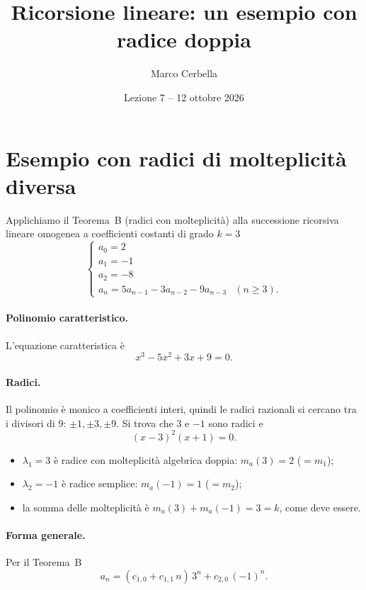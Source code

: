 \documentclass[11pt,a4paper]{article}
\title{Ricorsione lineare: un esempio con radice doppia}
\author{Marco Cerbella}
\date{Lezione 7 -- 12 ottobre 2026}
\begin{document}
\maketitle

\section{Esempio con radici di molteplicità diversa}

Applichiamo il Teorema~B (radici con molteplicità) alla successione ricorsiva lineare omogenea a coefficienti costanti di grado $k = 3$
\[
\begin{cases}
a_0 = 2 \\
a_1 = -1 \\
a_2 = -8 \\
a_n = 5a_{n-1} - 3a_{n-2} - 9a_{n-3} & (n \geq 3).
\end{cases}
\]

\paragraph{Polinomio caratteristico.} L'equazione caratteristica è
\[
x^3 - 5x^2 + 3x + 9 = 0 .
\]

\paragraph{Radici.} Il polinomio è monico a coefficienti interi, quindi le radici razionali si cercano tra i divisori di $9$: $\pm 1, \pm 3, \pm 9$. Si trova che $3$ e $-1$ sono radici e
\[
(x - 3)^2 (x + 1) = 0 .
\]
\begin{itemize}
    \item $\lambda_1 = 3$ è radice con molteplicità algebrica doppia: $m_a(3) = 2$ ($= m_1$);
    \item $\lambda_2 = -1$ è radice semplice: $m_a(-1) = 1$ ($= m_2$);
    \item la somma delle molteplicità è $m_a(3) + m_a(-1) = 3 = k$, come deve essere.
\end{itemize}

\paragraph{Forma generale.} Per il Teorema~B
\[
a_n = (c_{1,0} + c_{1,1}\, n)\, 3^n + c_{2,0}\, (-1)^n .
\]
\end{document}

